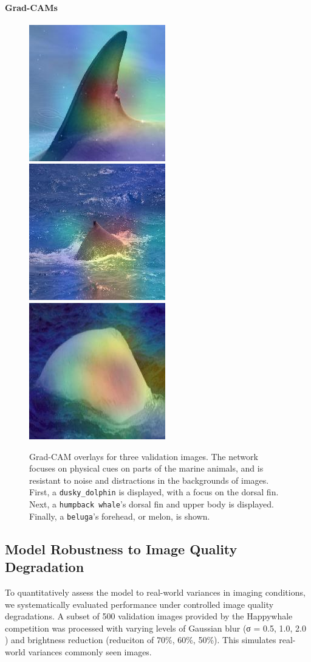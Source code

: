 \documentclass[twocolumn]{article}
\begin{document}
\paragraph{Grad-CAMs}
\begin{figure}[H]
  \includegraphics[width=0.32\linewidth]{gradcam_dusky_dolphin.jpg}
  \includegraphics[width=0.32\linewidth]{gradcam_humpback_whale.jpg}
  \includegraphics[width=0.32\linewidth]{gradcam_beluga.jpg}
  \caption{Grad-CAM overlays for three validation images.  The network focuses on physical cues on parts of the marine animals, and is resistant to noise and distractions in the backgrounds of images. First, a \texttt{dusky_dolphin} is displayed, with a focus on the dorsal fin. Next, a \texttt{humpback whale}'s dorsal fin and upper body is displayed. Finally, a \texttt{beluga}'s forehead, or melon, is shown.}
  \label{fig:gradcam_examples}
\end{figure}

\subsection{Model Robustness to Image Quality Degradation}

To quantitatively assess the model to real-world variances in imaging conditions, we systematically evaluated performance under controlled image quality degradations. A subset of 500 validation images provided by the Happywhale competition was processed with varying levels of Gaussian blur (σ = 0.5, 1.0, 2.0 ) and brightness reduction (reduciton of 70\%, 60\%, 50\%). This simulates real-world variances commonly seen images.
\end{document}
